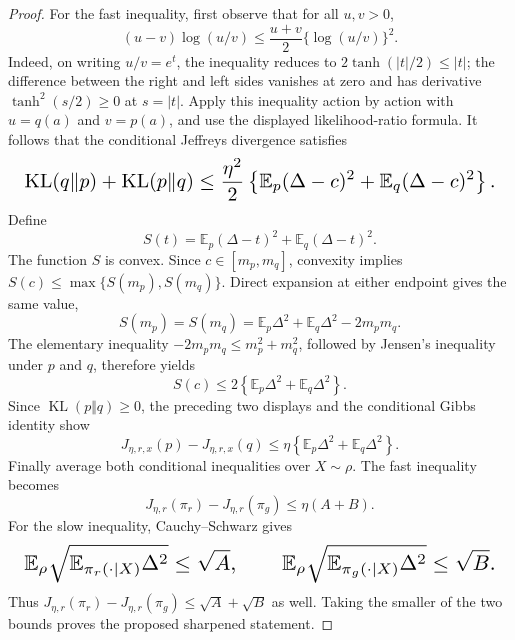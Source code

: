 \documentclass{article}
\begin{document}
\begin{proof}
For the fast inequality, first observe that for all \(u,v>0\),
\[
(u-v)\log(u/v)\le\frac{u+v}{2}\{\log(u/v)\}^2.
\]
Indeed, on writing \(u/v=e^t\), the inequality reduces to \(2\tanh(|t|/2)\le |t|\); the difference between the right and left sides vanishes at zero and has derivative \(\tanh^2(s/2)\ge0\) at \(s=|t|\). Apply this inequality action by action with \(u=q(a)\) and \(v=p(a)\), and use the displayed likelihood-ratio formula. It follows that the conditional Jeffreys divergence satisfies
\[
\makebox[\linewidth][c]{\resizebox{0.98\linewidth}{!}{\(\displaystyle \operatorname{KL}(q\Vert p)+\operatorname{KL}(p\Vert q)
\le\frac{\eta^2}{2}\left\{
\mathbb E_p(\Delta-c)^2+\mathbb E_q(\Delta-c)^2
\right\}.\)}}
\]
Define
\[
S(t)=\mathbb E_p(\Delta-t)^2+\mathbb E_q(\Delta-t)^2.
\]
The function \(S\) is convex. Since \(c\in[m_p,m_q]\), convexity implies \(S(c)\le\max\{S(m_p),S(m_q)\}\). Direct expansion at either endpoint gives the same value,
\[
S(m_p)=S(m_q)
=\mathbb E_p\Delta^2+\mathbb E_q\Delta^2-2m_pm_q.
\]
The elementary inequality \(-2m_pm_q\le m_p^2+m_q^2\), followed by Jensen's inequality under \(p\) and \(q\), therefore yields
\[
S(c)
\le2\left\{\mathbb E_p\Delta^2+\mathbb E_q\Delta^2\right\}.
\]
Since \(\operatorname{KL}(p\Vert q)\ge0\), the preceding two displays and the conditional Gibbs identity show
\[
J_{\eta,r,x}(p)-J_{\eta,r,x}(q)
\le\eta\left\{\mathbb E_p\Delta^2+\mathbb E_q\Delta^2\right\}.
\]
Finally average both conditional inequalities over \(X\sim\rho\). The fast inequality becomes
\[
J_{\eta,r}(\pi_r)-J_{\eta,r}(\pi_g)\le\eta(A+B).
\]
For the slow inequality, Cauchy--Schwarz gives
\[
\makebox[\linewidth][c]{\resizebox{0.98\linewidth}{!}{\(\displaystyle \mathbb E_\rho\sqrt{\mathbb E_{\pi_r(\cdot\mid X)}\Delta^2}\le\sqrt A,
\qquad
\mathbb E_\rho\sqrt{\mathbb E_{\pi_g(\cdot\mid X)}\Delta^2}\le\sqrt B.\)}}
\]
Thus \(J_{\eta,r}(\pi_r)-J_{\eta,r}(\pi_g)\le\sqrt A+\sqrt B\) as well. Taking the smaller of the two bounds proves the proposed sharpened statement.
\end{proof}
\end{document}

